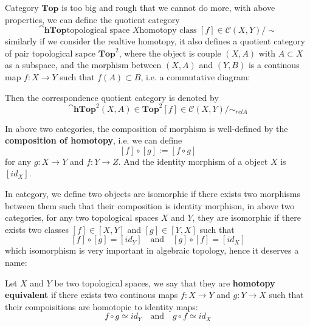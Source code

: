 \documentclass[12pt,a4paper]{article}
\begin{document}
\begin{remark}
    Category \(\mathbf{Top}\) is too big and rough that we cannot do more, with above properties, we can define the quotient category
    \[\cat{\mathbf{hTop}}{\text{topological space } X}{\text{homotopy class } [f] \in \mathcal{C}(X,Y)/\sim}\]
    similarly if we consider the realtive homotopy, it also defines a quotient category of pair topological sapce \(\mathbf{Top}^2\), where the object is couple \((X,A)\) with \(A \subset X\) as a subspace, and the morphism between \((X,A)\) and \((Y,B)\) is a continous map \(f:X \to Y\) such that \(f(A) \subset B\), i.e. a commutative diagram:
     Then the correspondence quotient category is denoted by
     \[\cat{\mathbf{hTop}^2}{(X,A) \in \mathbf{Top}^2}{[f] \in \mathcal{C}(X,Y)/\sim_{rel A}}\]

     In above two categories, the composition of morphism is well-defined by the \textbf{composition of homotopy}, i.e. we can define
     \[[f] \circ [g] := [f \circ g]\]
     for any \(g:X \to Y\) and \(f:Y \to Z\). And the identity morphism of a object \(X\) is \([id_X]\).
\end{remark}

In category, we define two objects are isomorphic if there exists two morphisms between them such that their composition is identity morphism, in above two categories, for any two topological spaces \(X \) and \(Y\), they are isomorphic if there exists two classes \([f] \in [X,Y]\) and \([g] \in [Y,X]\) such that
\[[f] \circ [g] = [id_Y] \quad \text{and} \quad [g] \circ [f] = [id_X]\]
which isomorphism is very important in algebraic topology, hence it deserves a name:
\begin{definitionplain}
    Let \(X\) and \(Y\) be two topological spaces, we say that they are \textbf{homotopy equivalent} if there exists two continous maps \(f:X \to Y\) and \(g:Y \to X\) such that their compoisitions are homotopic to identity maps:
    \[f \circ g \simeq id_Y \quad \text{and} \quad g \circ f \simeq id_X\]
\end{definitionplain}
\end{document}
